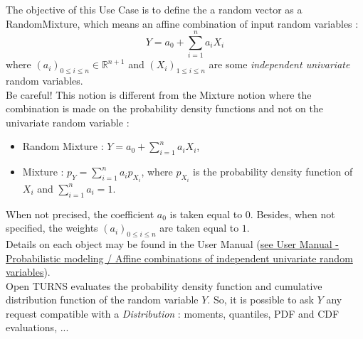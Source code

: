 \renewcommand{\filename}{docUC_OVI_RandomMixture.tex}
\renewcommand{\filetitle}{UC : Creation of a Random Mixture}

\HeaderIIILevel



The objective of this Use Case is to define the a random vector  as a RandomMixture, which means an affine combination of input random variables :
$$
\displaystyle Y = a_0 + \sum_{i=1}^n a_i X_i
$$
where $(a_i)_{ 0 \leq i \leq n} \in \mathbb{R}^{n+1}$ and $(X_i)_{ 1 \leq i \leq n}$ are some  \emph{independent univariate} random variables.\\

Be careful! This notion is different from the Mixture notion where the combination is made on the probability density functions and not on the univariate random variable :
\begin{itemize}
\item Random Mixture : $Y = a_0 + \sum_{i=1}^n a_i X_i$,
\item Mixture : $p_Y = \sum_{i=1}^n a_i p_{X_i}$, where $p_{X_i}$ is the probability density function of $X_i$ and $\sum_{i=1}^n a_i = 1$.
\end{itemize}

When not precised, the coefficient $a_0$ is taken equal to $0$. Besides, when not specified, the weights $(a_i)_{ 0 \leq i \leq n} $ are taken equal to $1$.\\


Details on each object may be found in the User Manual  (\href{OpenTURNS_UserManual_TUI.pdf}{see User Manual - Probabilistic modeling / Affine combinations of independent univariate random variables}).\\


Open TURNS evaluates the probability density function and cumulative distribution function of the random variable $Y$. So, it is possible to ask $Y$ any request compatible with a {\itshape Distribution} : moments, quantiles, PDF and CDF evaluations, ...\\

